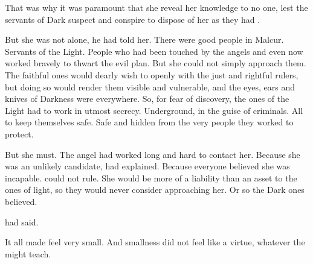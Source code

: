 That was why it was paramount that she reveal her knowledge to no one, lest the servants of Dark suspect and conspire to dispose of her as they had \Icor. 

But she was not alone, he had told her. 
There were good people in Malcur. 
Servants of the Light. 
People who had been touched by the angels and even now worked bravely to thwart the evil plan. 
But she could not simply approach them. 
The faithful ones would dearly wish to \cooperate{} openly with the just and rightful rulers, but doing so would render them visible and vulnerable, and the eyes, ears and knives of Darkness were everywhere. 
So, for fear of discovery, the ones of the Light had to work in utmost secrecy. 
Underground, in the guise of criminals. 
All to keep themselves safe. 
Safe and hidden from the very people they worked to protect. 


But she must. 
The angel had worked long and hard to contact her. 
Because she was an unlikely candidate, \Icor{} had explained. 
Because everyone believed she was incapable. 
\Tiroco{} could not rule.
She would be more of a liability than an asset to the ones of light, so they would never consider approaching her. 
Or so the Dark ones believed. 

 \Icor{} had said.

It all made \Tiroco{} feel very small. 
And smallness did not feel like a virtue, whatever the \sephirah{}  might teach. 

